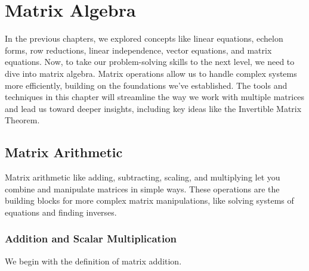 \chapter{Matrix Algebra}\label{chap:ch9}

In the previous chapters, we explored concepts like linear equations, echelon forms, row reductions, linear independence, vector equations, and matrix equations. Now, to take our problem-solving skills to the next level, we need to dive into matrix algebra. Matrix operations allow us to handle complex systems more efficiently, building on the foundations we've established. The tools and techniques in this chapter will streamline the way we work with multiple matrices and lead us toward deeper insights, including key ideas like the Invertible Matrix Theorem.

\section{Matrix Arithmetic}
Matrix arithmetic like adding, subtracting, scaling, and multiplying let you combine and manipulate matrices in simple ways. These operations are the building blocks for more complex matrix manipulations, like solving systems of equations and finding inverses.


\subsection*{Addition and Scalar Multiplication}
We begin with the definition of matrix addition.


